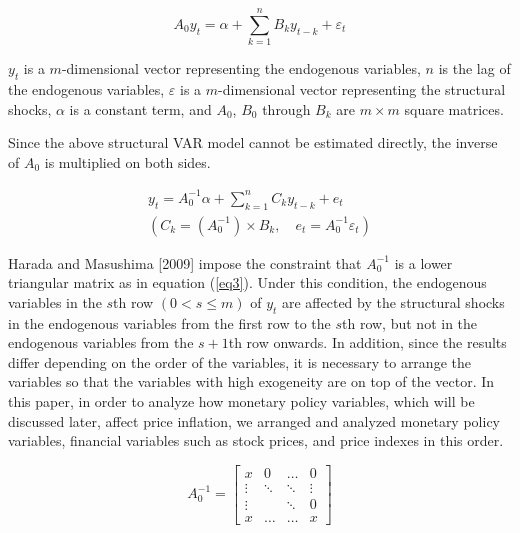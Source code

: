 \documentclass[12pt]{article}
\begin{document}
\begin{equation}
    \label{eq1}
    A_{0} y_{t} = \alpha + \sum_{k=1}^{n} B_{k} y_{t-k} + \varepsilon_t
\end{equation}

$y_t$ is a $m$-dimensional vector representing the endogenous variables, $n$ is the lag of the endogenous variables, $\varepsilon$ is a $m$-dimensional vector representing the structural shocks, $\alpha$ is a constant term, and $A_0$, $B_0$ through $B_k$ are $m\times m$ square matrices.

Since the above structural VAR model cannot be estimated directly, the inverse of $A_0$ is multiplied on both sides.

\begin{equation}
    \begin{split}
        \label{eq2}
        y_t =A_0^{-1} \alpha + \sum_{k=1}^{n} C_{k} y_{t-k} +e_t \\
        (C_k = (A_0^{-1})\times B_k, \quad e_{t} = A_0^{-1} \varepsilon_t)
    \end{split}
\end{equation}

Harada and Masushima [2009] impose the constraint that $A_0^{-1}$ is a lower triangular matrix as in equation (\ref{eq3}).
Under this condition, the endogenous variables in the $s$th row $(0 < s \leq m)$ of $y_t$ are affected by the structural shocks in the endogenous variables from the first row to the $s$th row, but not in the endogenous variables from the $s + 1$th row onwards.
In addition, since the results differ depending on the order of the variables, it is necessary to arrange the variables so that the variables with high exogeneity are on top of the vector.
In this paper, in order to analyze how monetary policy variables, which will be discussed later, affect price inflation, we arranged and analyzed monetary policy variables, financial variables such as stock prices, and price indexes in this order.

\begin{equation}
    \label{eq3}
    A_0^{-1} = \left[
        \begin{array} {cccc}
            x      & 0      & \ldots & 0      \\
            \vdots & \ddots & \ddots & \vdots \\
            \vdots & \      & \ddots & 0      \\
            x      & \ldots & \ldots & x
        \end{array}
        \right]
\end{equation}
\end{document}

